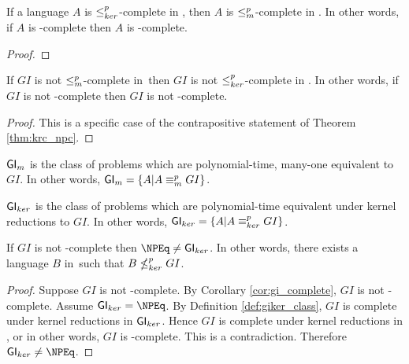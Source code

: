 \begin{theorem}\label{thm:krc_npc}If a language $A$ is $\leq^{p}_{ker}$-complete in \NPEq,
  then $A$ is $\leq^{p}_{m}$-complete in \NP. In other words, if $A$ is \NPEq-complete
  then $A$ is \NP-complete.\end{theorem}
\begin{proof}
\end{proof}

\begin{corollary}\label{cor:gi_complete}If $GI$ is not $\leq^{p}_{m}$-complete in
	\NP\,then $GI$ is not $\leq^{p}_{ker}$-complete in \NPEq. In other words, if $GI$ is not
  \NP-complete then $GI$ is not \NPEq-complete.\end{corollary}
\begin{proof}
  This is a specific case of the contrapositive statement of Theorem
  \ref{thm:krc_npc}.
\end{proof}

\begin{definition}\label{def:gim_class}${\mathsf{GI}}_m$ is the class of problems which
  are polynomial-time, many-one equivalent to $GI$. In other words,
  ${\mathsf{GI}}_m=\{A|A\equiv^{p}_m GI\}$.\end{definition}

\begin{definition}\label{def:giker_class}${\mathsf{GI}}_{ker}$ is the class of problems
	which are polynomial-time equivalent under kernel reductions to $GI$. In
	other words, ${\mathsf{GI}}_{ker}=\{A|A\equiv^{p}_{ker} GI\}$.\end{definition}

\begin{theorem}If $GI$ is not \NP-complete then $\NPEq\neq\GIker$. In other
	words, there exists a language $B$ in \NPEq\,such that $B\nleq^{p}_{ker}
	GI$.\end{theorem}
\begin{proof}
	Suppose $GI$ is not \NP-complete. By Corollary \ref{cor:gi_complete}, $GI$ is
  not \NPEq-complete. Assume $\GIker=\NPEq$. By Definition
  \ref{def:giker_class}, $GI$ is complete under kernel reductions in
  ${\mathsf{GI}}_{ker}$. Hence $GI$ is complete under kernel reductions in \NPEq, or in
  other words, $GI$ is \NPEq-complete. This is a contradiction. Therefore
  $\GIker\neq\NPEq$.

\end{proof}
